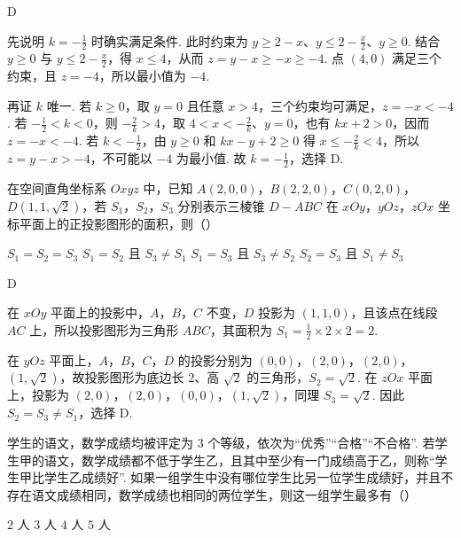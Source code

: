 \begin{answer}
D
\end{answer}

\begin{solution}
先说明 \(k=-\frac12\) 时确实满足条件. 此时约束为 \(y\geqslant2-x\)、\(y\leqslant2-\frac{x}{2}\)、\(y\geqslant0\). 结合 \(y\geqslant0\) 与 \(y\leqslant2-\frac{x}{2}\)，得 \(x\leqslant4\)，从而
\(z=y-x\geqslant-x\geqslant-4\). 点 \((4,0)\) 满足三个约束，且 \(z=-4\)，所以最小值为 \(-4\).

再证 \(k\) 唯一. 若 \(k\geqslant0\)，取 \(y=0\) 且任意 \(x>4\)，三个约束均可满足，\(z=-x<-4\). 若 \(-\frac12<k<0\)，则 \(-\frac2k>4\)，取 \(4<x<-\frac2k\)、\(y=0\)，也有 \(kx+2>0\)，因而 \(z=-x<-4\). 若 \(k<-\frac12\)，由 \(y\geqslant0\) 和 \(kx-y+2\geqslant0\) 得 \(x\leqslant-\frac2k<4\)，所以 \(z=y-x>-4\)，不可能以 \(-4\) 为最小值. 故 \(k=-\frac12\)，选择 D.
\end{solution}

\begin{problem}
在空间直角坐标系 \(Oxyz\) 中，已知 \(A(2,0,0)\)，\(B(2,2,0)\)，\(C(0,2,0)\)，\(D(1,1,\sqrt{2})\)，若 \(S_{1}\)，\(S_{2}\)，\(S_{3}\) 分别表示三棱锥 \(D-ABC\) 在 \(xOy\)，\(yOz\)，\(zOx\) 坐标平面上的正投影图形的面积，则（\quad）

\choices
    {\(S_{1} = S_{2} = S_{3}\)}
    {\(S_{1} = S_{2}\) 且 \(S_{3}\neq S_{1}\)}
    {\(S_{1} = S_{3}\) 且 \(S_{3}\neq S_{2}\)}
    {\(S_{2} = S_{3}\) 且 \(S_{1}\neq S_{3}\)}
\end{problem}

\begin{answer}
D
\end{answer}

\begin{solution}
在 \(xOy\) 平面上的投影中，\(A\)，\(B\)，\(C\) 不变，\(D\) 投影为 \((1,1,0)\)，且该点在线段 \(AC\) 上，所以投影图形为三角形 \(ABC\)，其面积为
\(S_{1}=\frac12\times2\times2=2\).

在 \(yOz\) 平面上，\(A\)，\(B\)，\(C\)，\(D\) 的投影分别为 \((0,0)\)，\((2,0)\)，\((2,0)\)，\((1,\sqrt2)\)，故投影图形为底边长 \(2\)、高 \(\sqrt2\) 的三角形，\(S_{2}=\sqrt2\). 在 \(zOx\) 平面上，投影为 \((2,0)\)，\((2,0)\)，\((0,0)\)，\((1,\sqrt2)\)，同理 \(S_{3}=\sqrt2\). 因此 \(S_{2}=S_{3}\ne S_{1}\)，选择 D.
\end{solution}

\begin{problem}
学生的语文，数学成绩均被评定为 \(3\text{ 个等级}\)，依次为“优秀”“合格”“不合格”. 若学生甲的语文，数学成绩都不低于学生乙，且其中至少有一门成绩高于乙，则称“学生甲比学生乙成绩好”. 如果一组学生中没有哪位学生比另一位学生成绩好，并且不存在语文成绩相同，数学成绩也相同的两位学生，则这一组学生最多有（\quad）

\choices
    {\(2\text{ 人}\)}
    {\(3\text{ 人}\)}
    {\(4\text{ 人}\)}
    {\(5\text{ 人}\)}
\end{problem}


